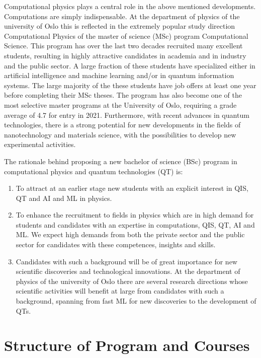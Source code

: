 \documentclass[aps,rmp,preprint,amsmath,amssymb,graphicx,longbibliography]{revtex4-1}
\begin{document}
Computational physics plays a central role in the above mentioned
developments.  Computations are simply indispensable.  At the
department of physics of the university of Oslo this is reflected in
the extremely popular study direction Computational Physics of the
master of science (MSc) program Computational Science. This program
has over the last two decades recruited many excellent students,
resulting in highly attractive candidates in academia and in industry
and the public sector. A large fraction of these students have
specialized either in artificial intelligence and machine learning
and/or in quantum information systems.  The large majority of the
these students have job offers at least one year before completing
their MSc theses. The program has also become one of the most
selective master programs at the University of Oslo, requiring a grade
average of 4.7 for entry in 2021. Furthermore, with recent advances in
quantum technologies, there is a strong potential for new developments
in the fields of nanotechnology and materials science, with the
possibilities to develop new experimental activities.

The rationale behind proposing a new bachelor of science (BSc) program in computational physics and quantum technologies (QT) is:
\begin{enumerate}
    \item To attract at an earlier stage new students with an explicit interest in QIS, QT and AI and ML in physics. 
    \item To enhance the recruitment to fields in physics which are in high demand for students and candidates with an expertise in computations, QIS, QT, AI and ML. We expect high demands from both the private sector and the public sector for candidates with these competences, insights and skills.
    \item Candidates with such a background will be of great importance for new scientific discoveries and technological innovations. At the department of physics of the university of Oslo there are several research directions whose scientific activities will benefit at large from candidates with such a background, spanning from fast ML for new discoveries to the development of QTs.   
\end{enumerate}


\section{Structure of Program and Courses}
\end{document}
